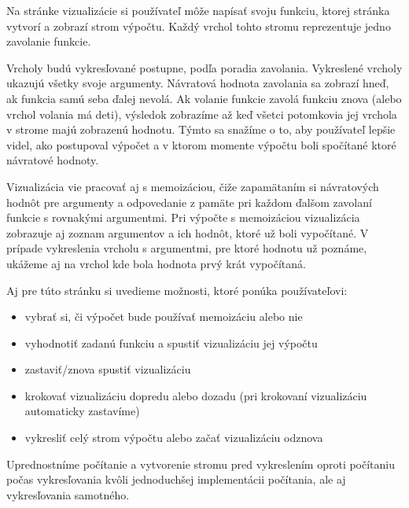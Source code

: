 Na stránke vizualizácie si používateľ môže napísať svoju funkciu, ktorej stránka vytvorí
a zobrazí strom výpočtu. Každý vrchol tohto stromu reprezentuje jedno zavolanie funkcie.

Vrcholy budú vykresľované postupne, podľa poradia zavolania.
Vykreslené vrcholy ukazujú všetky svoje argumenty. Návratová hodnota zavolania
sa zobrazí hneď, ak funkcia samú seba ďalej nevolá. Ak volanie funkcie zavolá funkciu znova (alebo vrchol volania má deti),
výsledok zobrazíme až keď všetci potomkovia jej vrchola v strome
majú zobrazenú hodnotu. Týmto sa snažíme o to, aby používateľ lepšie videl, ako postupoval výpočet a v ktorom momente výpočtu
boli spočítané ktoré návratové hodnoty.

Vizualizácia vie pracovať aj s memoizáciou, čiže zapamätaním si návratových hodnôt pre
argumenty a odpovedanie z pamäte pri každom ďalšom zavolaní funkcie s rovnakými argumentmi.
Pri výpočte s memoizáciou vizualizácia zobrazuje aj zoznam argumentov a ich hodnôt, ktoré už boli vypočítané.
V prípade vykreslenia vrcholu s argumentmi, pre ktoré hodnotu už poznáme, ukážeme aj na vrchol
kde bola hodnota prvý krát vypočítaná.

Aj pre túto stránku si uvedieme možnosti, ktoré ponúka používateľovi:
\begin{itemize}
  \item vybrať si, či výpočet bude používať memoizáciu alebo nie
  \item vyhodnotiť zadanú funkciu a spustiť vizualizáciu jej výpočtu
  \item zastaviť/znova spustiť vizualizáciu
  \item krokovať vizualizáciu dopredu alebo dozadu (pri krokovaní vizualizáciu
   automaticky zastavíme)
  \item vykresliť celý strom výpočtu alebo začať vizualizáciu odznova
\end{itemize}

Uprednostníme počítanie a vytvorenie stromu pred vykreslením oproti počítaniu počas vykresľovania
kvôli jednoduchšej implementácii počítania, ale aj vykresľovania samotného.
